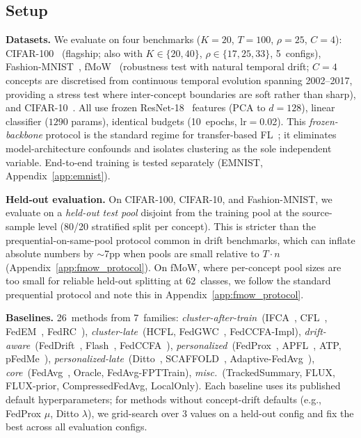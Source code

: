 \documentclass[11pt]{article}
\begin{document}
\subsection{Setup}

\textbf{Datasets.}
We evaluate on four benchmarks ($K{=}20$, $T{=}100$, $\rho{=}25$, $C{=}4$):
CIFAR-100~\citep{krizhevsky2009learning} (flagship; also with $K{\in}\{20,40\}$, $\rho{\in}\{17,25,33\}$, 5~configs),
Fashion-MNIST~\citep{xiao2017fashion},
fMoW~\citep{koh2021wilds} (robustness test with natural temporal drift; $C{=}4$ concepts are discretised from continuous temporal evolution spanning 2002--2017, providing a stress test where inter-concept boundaries are soft rather than sharp),
and CIFAR-10~\citep{krizhevsky2009learning}.
All use frozen ResNet-18~\citep{he2016deep} features (PCA to $d{=}128$), linear classifier ($1290$ params), identical budgets (10~epochs, lr$=$0.02).
This \emph{frozen-backbone} protocol is the standard regime for transfer-based FL~\citep{chen2022on, oh2022fedbabu, collins2021exploiting}; it eliminates model-architecture confounds and isolates clustering as the sole independent variable.
End-to-end training is tested separately (EMNIST, Appendix~\ref{app:emnist}).

\textbf{Held-out evaluation.}
On CIFAR-100, CIFAR-10, and Fashion-MNIST, we evaluate on a \emph{held-out test pool} disjoint from the training pool at the source-sample level (80/20 stratified split per concept).
This is stricter than the prequential-on-same-pool protocol common in drift benchmarks, which can inflate absolute numbers by ${\sim}$7pp when pools are small relative to $T \cdot n$ (Appendix~\ref{app:fmow_protocol}).
On fMoW, where per-concept pool sizes are too small for reliable held-out splitting at 62~classes, we follow the standard prequential protocol and note this in Appendix~\ref{app:fmow_protocol}.

\textbf{Baselines.}
26~methods from 7~families:
\emph{cluster-after-train}~(IFCA~\citep{ghosh2020efficient}, CFL~\citep{sattler2021clustered}, FedEM~\citep{marfoq2021federated}, FedRC~\citep{guo2024fedrc}),
\emph{cluster-late}~(HCFL, FedGWC~\citep{licciardi2025fedgwc}, FedCCFA-Impl),
\emph{drift-aware}~(FedDrift~\citep{jothimurugesan2023federated}, Flash~\citep{panchal2023flash}, FedCCFA~\citep{chen2024fedccfa}),
\emph{personalized}~(FedProx~\citep{li2020federated}, APFL~\citep{deng2020adaptive}, ATP, pFedMe~\citep{t2020personalized}),
\emph{personalized-late}~(Ditto~\citep{li2021ditto}, SCAFFOLD~\citep{karimireddy2020scaffold}, Adaptive-FedAvg~\citep{reddi2021adaptive}),
\emph{core}~(FedAvg~\citep{mcmahan2017communication}, Oracle, FedAvg-FPTTrain),
\emph{misc.}~(TrackedSummary, FLUX, FLUX-prior, CompressedFedAvg, LocalOnly).
Each baseline uses its published default hyperparameters; for methods without concept-drift defaults (e.g., FedProx $\mu$, Ditto $\lambda$), we grid-search over 3 values on a held-out config and fix the best across all evaluation configs.
\end{document}
